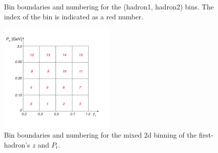 \begin{figure}[H]
\captionsetup[subfloat]{farskip=2pt,captionskip=1pt}
\centering
{}
\caption[Bin boundaries and numbering for the 2d binning in $z$ or $P_{t}$ of the two hadrons]{Bin boundaries and numbering for the (hadron1, hadron2) bins. The index of the bin is indicated as a red number.}
\label{fig:binnings}
\end{figure}

\begin{figure}[H]
    \centering
    \includegraphics[width=0.5\textwidth,natwidth=250,natheight=100]{figure_dataselection/zptbin.pdf}
    \caption{Bin boundaries and numbering for the mixed 2d binning of the first-hadron's $z$ and $P_t$.}
    \label{fig:zptbin}
\end{figure}



